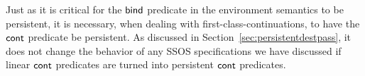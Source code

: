 Just as it is critical for the ${\sf bind}$ predicate in the
environment semantics to be persistent, it is necessary, when dealing
with first-class-continuations, to have the ${\sf cont}$ predicate be
persistent. As discussed in Section~\ref{sec:persistentdestpass}, it
does not change the behavior of any SSOS specifications we have
discussed if linear ${\sf cont}$ predicates are turned into persistent
${\sf cont}$ predicates.

